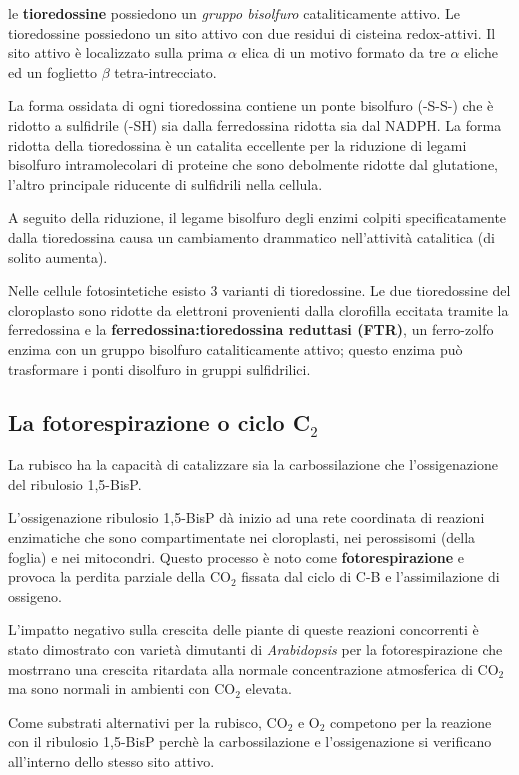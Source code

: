 \documentclass[]{article}
\begin{document}
le \textbf{tioredossine} possiedono un \emph{gruppo bisolfuro}
cataliticamente attivo. Le tioredossine possiedono un sito attivo con
due residui di cisteina redox-attivi. Il sito attivo è localizzato sulla
prima $\alpha$ elica di un motivo formato da tre $\alpha$ eliche ed un
foglietto $\beta$ tetra-intrecciato.

La forma ossidata di ogni tioredossina contiene un ponte bisolfuro
(-S-S-) che è ridotto a sulfidrile (-SH) sia dalla ferredossina ridotta
sia dal NADPH. La forma ridotta della tioredossina è un catalita
eccellente per la riduzione di legami bisolfuro intramolecolari di
proteine che sono debolmente ridotte dal glutatione, l'altro principale
riducente di sulfidrili nella cellula.

A seguito della riduzione, il legame bisolfuro degli enzimi colpiti
specificatamente dalla tioredossina causa un cambiamento drammatico
nell'attività catalitica (di solito aumenta).

Nelle cellule fotosintetiche esisto 3 varianti di tioredossine. Le due
tioredossine del cloroplasto sono ridotte da elettroni provenienti dalla
clorofilla eccitata tramite la ferredossina e la
\textbf{ferredossina:tioredossina reduttasi (FTR)}, un ferro-zolfo
enzima con un gruppo bisolfuro cataliticamente attivo; questo enzima può
trasformare i ponti disolfuro in gruppi sulfidrilici.

\subsection{La fotorespirazione o ciclo
C$_2$}\label{la-fotorespirazione-o-ciclo-cux5f2}

La rubisco ha la capacità di catalizzare sia la carbossilazione che
l'ossigenazione del ribulosio 1,5-BisP.

L'ossigenazione ribulosio 1,5-BisP dà inizio ad una rete coordinata di
reazioni enzimatiche che sono compartimentate nei cloroplasti, nei
perossisomi (della foglia) e nei mitocondri. Questo processo è noto come
\textbf{fotorespirazione} e provoca la perdita parziale della CO$_2$
fissata dal ciclo di C-B e l'assimilazione di ossigeno.

L'impatto negativo sulla crescita delle piante di queste reazioni
concorrenti è stato dimostrato con varietà dimutanti di
\emph{Arabidopsis} per la fotorespirazione che mostrrano una crescita
ritardata alla normale concentrazione atmosferica di CO$_2$ ma sono
normali in ambienti con CO$_2$ elevata.

Come substrati alternativi per la rubisco, CO$_2$ e O$_2$ competono per
la reazione con il ribulosio 1,5-BisP perchè la carbossilazione e
l'ossigenazione si verificano all'interno dello stesso sito attivo.
\end{document}
